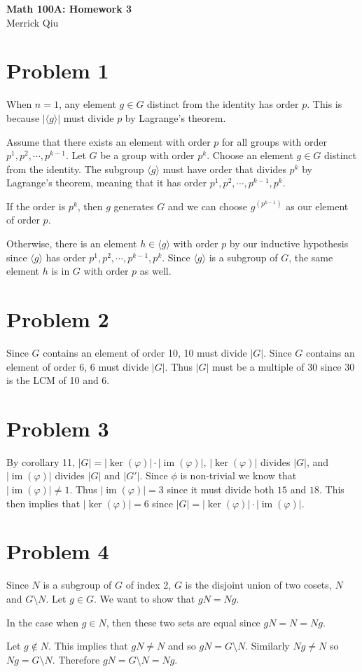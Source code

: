 \documentclass{article}
\DeclareMathOperator{\im}{im}
\begin{document}
\begin{center}
	\huge{\bf Math 100A: Homework 3} \\
	Merrick Qiu
\end{center}

\section*{Problem 1}
When $n = 1$,
any element $g \in G$ distinct from the identity has order $p$.
This is because $|\langle g \rangle|$ must divide $p$ by Lagrange's theorem.

Assume that there
exists an element with order $p$ for all groups with order 
$p^1, p^2, \cdots, p^{k-1}$.
Let $G$ be a group with order $p^k$.
Choose an element $g \in G$ distinct from the identity.
The subgroup $\langle g \rangle$ must have order that divides $p^{k}$
by Lagrange's theorem, meaning that it has order $p^1, p^2, \cdots, p^{k-1}, p^k$.

If the order is $p^k$, then $g$ generates $G$ and we can choose 
$g^{(p^{k-1})}$ as our element of order $p$.

Otherwise, there is an element $h \in \langle g \rangle$
with order $p$ by our inductive hypothesis since $\langle g \rangle$
has order $p^1, p^2, \cdots, p^{k-1}, p^k$.
Since $\langle g \rangle$ is a subgroup of $G$,
the same element $h$ is in $G$ with order $p$ as well.

\section*{Problem 2}
Since $G$ contains an element of order 10, 
10 must divide $|G|$.
Since $G$ contains an element of order 6,
6 must divide $|G|$.
Thus $|G|$ must be a multiple of 30
since 30 is the LCM of 10 and 6.

\section*{Problem 3}
By corollary 11,
$|G| = |\ker(\varphi)|\cdot|\im(\varphi)|$,
$|\ker(\varphi)|$ divides $|G|$, and 
$|\im(\varphi)|$ divides $|G|$ and $|G'|$.
Since $\phi$ is non-trivial we know that 
$|\im(\varphi)| \neq 1$.
Thus $|\im(\varphi)| = 3$ since it must divide both $15$ and $18$.
This then implies that $|\ker(\varphi)| = 6$ since 
$|G| = |\ker(\varphi)|\cdot|\im(\varphi)|$.

\section*{Problem 4}
Since $N$ is a subgroup of $G$ of index 2, $G$ is the disjoint
union of two cosets, $N$ and $G \setminus N$.
Let $g \in G$.
We want to show that $gN = Ng$.

In the case when $g \in N$, then these two sets are equal
since $gN = N = Ng$.

Let $g \notin N$.
This implies that $gN \neq N$ and so $gN = G \setminus N$.
Similarly $Ng \neq N$ so $Ng = G \setminus N$.
Therefore $gN = G \setminus N = Ng$.
\end{document}
